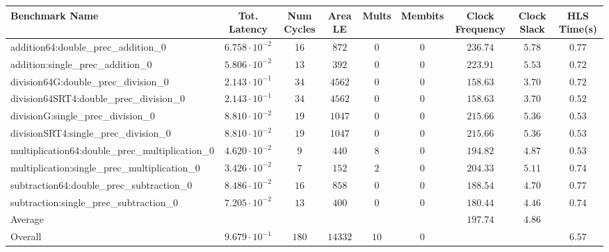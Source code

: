 \begin{tabular}{|l|c|c|c|c|c|c|c|c|}
\hline
Benchmark Name                                   & Tot. Latency            & Num Cycles & Area LE   & Mults  & Membits & Clock Frequency & Clock Slack & HLS Time(s) \\
\hline
addition64:double\_prec\_addition\_0             & $ 6.758 \cdot 10^{-2} $ & $ 16     $ & $ 872   $ & $ 0  $ & $ 0   $ & $ 236.74      $ & $ 5.78    $ & $ 0.77    $ \\
addition:single\_prec\_addition\_0               & $ 5.806 \cdot 10^{-2} $ & $ 13     $ & $ 392   $ & $ 0  $ & $ 0   $ & $ 223.91      $ & $ 5.53    $ & $ 0.72    $ \\
division64G:double\_prec\_division\_0            & $ 2.143 \cdot 10^{-1} $ & $ 34     $ & $ 4562  $ & $ 0  $ & $ 0   $ & $ 158.63      $ & $ 3.70    $ & $ 0.72    $ \\
division64SRT4:double\_prec\_division\_0         & $ 2.143 \cdot 10^{-1} $ & $ 34     $ & $ 4562  $ & $ 0  $ & $ 0   $ & $ 158.63      $ & $ 3.70    $ & $ 0.52    $ \\
divisionG:single\_prec\_division\_0              & $ 8.810 \cdot 10^{-2} $ & $ 19     $ & $ 1047  $ & $ 0  $ & $ 0   $ & $ 215.66      $ & $ 5.36    $ & $ 0.53    $ \\
divisionSRT4:single\_prec\_division\_0           & $ 8.810 \cdot 10^{-2} $ & $ 19     $ & $ 1047  $ & $ 0  $ & $ 0   $ & $ 215.66      $ & $ 5.36    $ & $ 0.53    $ \\
multiplication64:double\_prec\_multiplication\_0 & $ 4.620 \cdot 10^{-2} $ & $ 9      $ & $ 440   $ & $ 8  $ & $ 0   $ & $ 194.82      $ & $ 4.87    $ & $ 0.53    $ \\
multiplication:single\_prec\_multiplication\_0   & $ 3.426 \cdot 10^{-2} $ & $ 7      $ & $ 152   $ & $ 2  $ & $ 0   $ & $ 204.33      $ & $ 5.11    $ & $ 0.74    $ \\
subtraction64:double\_prec\_subtraction\_0       & $ 8.486 \cdot 10^{-2} $ & $ 16     $ & $ 858   $ & $ 0  $ & $ 0   $ & $ 188.54      $ & $ 4.70    $ & $ 0.77    $ \\
subtraction:single\_prec\_subtraction\_0         & $ 7.205 \cdot 10^{-2} $ & $ 13     $ & $ 400   $ & $ 0  $ & $ 0   $ & $ 180.44      $ & $ 4.46    $ & $ 0.74    $ \\
\hline
Average                                          & $                     $ & $        $ & $       $ & $    $ & $     $ & $ 197.74      $ & $ 4.86    $ & $         $ \\
\hline
Overall                                          & $ 9.679 \cdot 10^{-1} $ & $ 180    $ & $ 14332 $ & $ 10 $ & $ 0   $ & $             $ & $         $ & $ 6.57    $ \\
\hline
\end{tabular}
